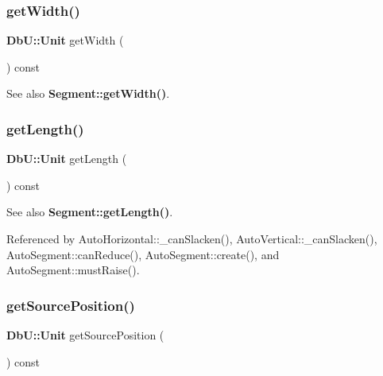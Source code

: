 \subsubsection{\texorpdfstring{get\+Width()}{getWidth()}}
{\footnotesize\ttfamily \textbf{ Db\+U\+::\+Unit} get\+Width (\begin{DoxyParamCaption}{ }\end{DoxyParamCaption}) const\hspace{0.3cm}{\ttfamily [inline]}}

\begin{DoxySeeAlso}{See also}
\textbf{ Segment\+::get\+Width()}. 
\end{DoxySeeAlso}
\mbox{\label{classKatabatic_1_1AutoSegment_ab1ca7adfc68761c749a16f65c9aa4088}} 
\subsubsection{\texorpdfstring{get\+Length()}{getLength()}}
{\footnotesize\ttfamily \textbf{ Db\+U\+::\+Unit} get\+Length (\begin{DoxyParamCaption}{ }\end{DoxyParamCaption}) const\hspace{0.3cm}{\ttfamily [inline]}}

\begin{DoxySeeAlso}{See also}
\textbf{ Segment\+::get\+Length()}. 
\end{DoxySeeAlso}


Referenced by Auto\+Horizontal\+::\+\_\+can\+Slacken(), Auto\+Vertical\+::\+\_\+can\+Slacken(), Auto\+Segment\+::can\+Reduce(), Auto\+Segment\+::create(), and Auto\+Segment\+::must\+Raise().

\mbox{\label{classKatabatic_1_1AutoSegment_a8a88dc051a8d324aff8763609957dcaa}} 
\subsubsection{\texorpdfstring{get\+Source\+Position()}{getSourcePosition()}}
{\footnotesize\ttfamily \textbf{ Db\+U\+::\+Unit} get\+Source\+Position (\begin{DoxyParamCaption}{ }\end{DoxyParamCaption}) const\hspace{0.3cm}{\ttfamily [inline]}}

